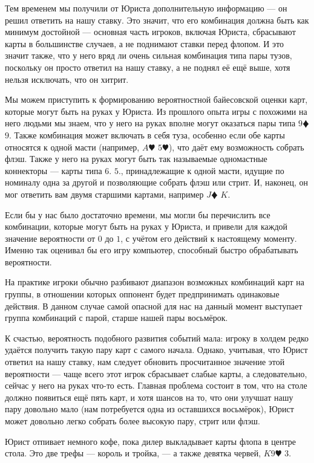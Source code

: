 Тем временем мы получили от Юриста дополнительную информацию --- он решил ответить на нашу ставку. Это значит, что его комбинация должна быть как минимум достойной --- основная часть игроков, включая Юриста, сбрасывают карты в большинстве случаев, а не поднимают ставки перед флопом. И это значит также, что у него вряд ли очень сильная комбинация типа пары тузов, поскольку он просто ответил на нашу ставку, а не поднял её ещё выше, хотя нельзя исключать, что он хитрит.

Мы можем приступить к формированию вероятностной байесовской оценки карт, которые могут быть на руках у Юриста. Из прошлого опыта игры с похожими на него людьми мы знаем, что у него на руках вполне могут оказаться пары типа  $9\vardiamond$  $9$\spadesuit. Также комбинация может включать в себя туза, особенно если обе карты относятся к одной масти (например, $A\varheart$  $5\varheart$), что даёт ему возможность собрать флэш. Также у него на руках могут быть так называемые одномастные коннекторы --- карты типа $6$\spadesuit.  $5$\spadesuit., принадлежащие к одной масти, идущие по номиналу одна за другой и позволяющие собрать флэш или стрит. И, наконец, он мог ответить вам двумя старшими картами, например $J \vardiamond$  $K$\spadesuit.

Если бы у нас было достаточно времени, мы могли бы перечислить все комбинации, которые могут быть на руках у Юриста, и привели для каждой значение вероятности от $0$ до $1$, с учётом его действий к настоящему моменту. Именно так оценивал бы его игру компьютер, способный быстро обрабатывать вероятности.

На практике игроки обычно разбивают диапазон возможных комбинаций карт на группы, в отношении которых оппонент будет предпринимать одинаковые действия. В данном случае самой опасной для нас на данный момент выступает группа комбинаций с парой, старше нашей пары восьмёрок.

К счастью, вероятность подобного развития событий мала: игроку в холдем редко удаётся получить такую пару карт с самого начала. Однако, учитывая, что Юрист ответил на нашу ставку, нам следует обновить просчитанное значение этой вероятности --- чаще всего этот игрок сбрасывает слабые карты, а следовательно, сейчас у него на руках что-то есть. Главная проблема состоит в том, что на столе должно появиться ещё пять карт, и хотя шансов на то, что они улучшат нашу пару довольно мало (нам потребуется одна из оставшихся восьмёрок), Юрист может довольно легко собрать более высокую пару, стрит или флэш.

Юрист отпивает немного кофе, пока дилер выкладывает карты флопа в центре стола. Это две трефы --- король и тройка, --- а также девятка червей,   $K$\clubsuit  $9\varheart$  $3$\clubsuit.

